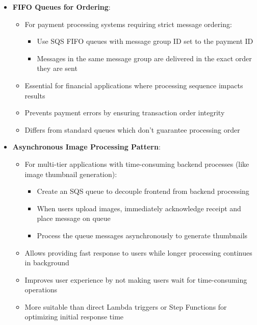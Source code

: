 \documentclass[11pt,a4paper]{report}
\begin{document}
\begin{itemize}
\begin{itemize}
  \item More effective than SNS for microservices that need to process data sequentially
  \item Better solution than using Lambda functions or DynamoDB Streams for basic inter-service communication
  \item Particularly useful when migrating from monolithic to microservices architectures
\end{itemize}
  \item \textbf{FIFO Queues for Ordering}:
\begin{itemize}
  \item For payment processing systems requiring strict message ordering:
\begin{itemize}
  \item Use SQS FIFO queues with message group ID set to the payment ID
  \item Messages in the same message group are delivered in the exact order they are sent
\end{itemize}
  \item Essential for financial applications where processing sequence impacts results
  \item Prevents payment errors by ensuring transaction order integrity
  \item Differs from standard queues which don't guarantee processing order
\end{itemize}
  \item \textbf{Asynchronous Image Processing Pattern}:
\begin{itemize}
  \item For multi-tier applications with time-consuming backend processes (like image thumbnail generation):
\begin{itemize}
  \item Create an SQS queue to decouple frontend from backend processing
  \item When users upload images, immediately acknowledge receipt and place message on queue
  \item Process the queue messages asynchronously to generate thumbnails
\end{itemize}
  \item Allows providing fast response to users while longer processing continues in background
  \item Improves user experience by not making users wait for time-consuming operations
  \item More suitable than direct Lambda triggers or Step Functions for optimizing initial response time

\end{itemize}
\end{itemize}
\end{document}
